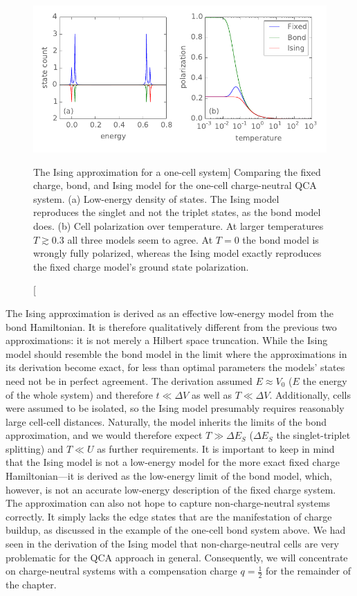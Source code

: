 %
\begin{figure}
  \center
  \includegraphics{ising_approximation1}
  \caption
  [The Ising approximation for a one-cell system]
  {
  Comparing the fixed charge, bond, and Ising model for the one-cell
  charge-neutral QCA system. (a) Low-energy density of states. The Ising model
  reproduces the singlet and not the triplet states, as the bond model does. (b)
  Cell polarization over temperature. At larger temperatures $T \gtrsim 0.3$ all
  three models seem to agree. At $T = 0$ the bond model is wrongly fully
  polarized, whereas the Ising model exactly reproduces the fixed charge model's
  ground state polarization.
  }
  \label{fig:ising_approximation1}
\end{figure}
%
The Ising approximation is derived as an effective low-energy model from the
bond Hamiltonian. It is therefore qualitatively different from the previous two
approximations: it is not merely a Hilbert space truncation. While the Ising
model should resemble the bond model in the limit where the approximations in
its derivation become exact, for less than optimal parameters the models' states
need not be in perfect agreement. The derivation assumed $E \approx V_0$ ($E$
the energy of the whole system) and therefore $t \ll \Delta V$ as well as $T \ll
\Delta V$. Additionally, cells were assumed to be isolated, so the Ising model
presumably requires reasonably large cell-cell distances. Naturally, the model
inherits the limits of the bond approximation, and we would therefore expect $T
\gg \Delta E_S$ ($\Delta E_S$ the singlet-triplet splitting) and $T \ll U$ as
further requirements. It is important to keep in mind that the Ising model is
not a low-energy model for the more exact fixed charge Hamiltonian---it is
derived as the low-energy limit of the bond model, which, however, is not an
accurate low-energy description of the fixed charge system. The approximation
can also not hope to capture non-charge-neutral systems correctly. It simply
lacks the edge states that are the manifestation of charge buildup, as discussed
in the example of the one-cell bond system above. We had seen in the derivation
of the Ising model that non-charge-neutral cells are very problematic for the
QCA approach in general. Consequently, we will concentrate on charge-neutral
systems with a compensation charge $q = \frac{1}{2}$ for the remainder of the
chapter.

